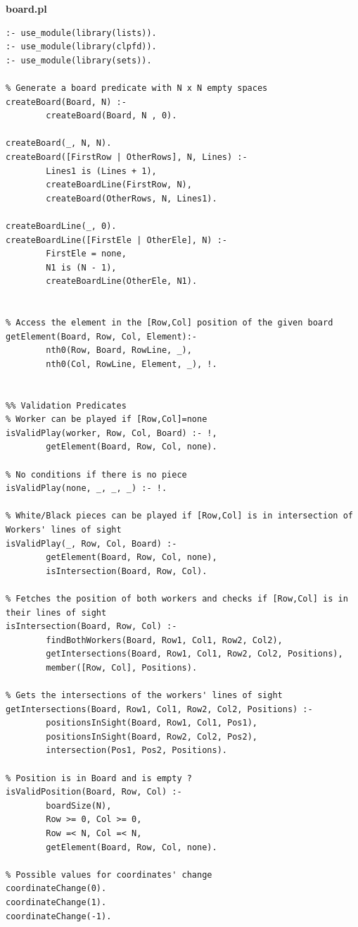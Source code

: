 \documentclass[a4paper]{article}
\begin{document}
\huge\textbf{board.pl}
\begin{lstlisting}
:- use_module(library(lists)).
:- use_module(library(clpfd)).
:- use_module(library(sets)).

% Generate a board predicate with N x N empty spaces
createBoard(Board, N) :-
        createBoard(Board, N , 0).

createBoard(_, N, N).
createBoard([FirstRow | OtherRows], N, Lines) :-
        Lines1 is (Lines + 1),
        createBoardLine(FirstRow, N),
        createBoard(OtherRows, N, Lines1).
        
createBoardLine(_, 0).
createBoardLine([FirstEle | OtherEle], N) :-
        FirstEle = none,
        N1 is (N - 1),
        createBoardLine(OtherEle, N1).


% Access the element in the [Row,Col] position of the given board
getElement(Board, Row, Col, Element):-
        nth0(Row, Board, RowLine, _),
        nth0(Col, RowLine, Element, _), !.


%% Validation Predicates
% Worker can be played if [Row,Col]=none
isValidPlay(worker, Row, Col, Board) :- !,
        getElement(Board, Row, Col, none).

% No conditions if there is no piece
isValidPlay(none, _, _, _) :- !.

% White/Black pieces can be played if [Row,Col] is in intersection of Workers' lines of sight
isValidPlay(_, Row, Col, Board) :-
        getElement(Board, Row, Col, none),
        isIntersection(Board, Row, Col).

% Fetches the position of both workers and checks if [Row,Col] is in their lines of sight
isIntersection(Board, Row, Col) :-
        findBothWorkers(Board, Row1, Col1, Row2, Col2),
        getIntersections(Board, Row1, Col1, Row2, Col2, Positions),
        member([Row, Col], Positions).

% Gets the intersections of the workers' lines of sight
getIntersections(Board, Row1, Col1, Row2, Col2, Positions) :-
        positionsInSight(Board, Row1, Col1, Pos1),
        positionsInSight(Board, Row2, Col2, Pos2),
        intersection(Pos1, Pos2, Positions).

% Position is in Board and is empty ?
isValidPosition(Board, Row, Col) :-
        boardSize(N),
        Row >= 0, Col >= 0,
        Row =< N, Col =< N,
        getElement(Board, Row, Col, none).

% Possible values for coordinates' change
coordinateChange(0).
coordinateChange(1).
coordinateChange(-1).


\end{lstlisting}
\end{document}
